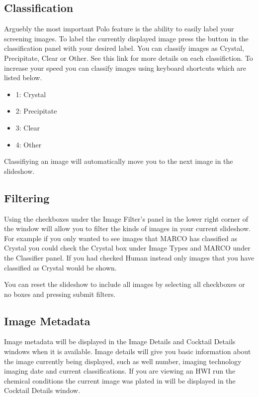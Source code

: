 \documentclass[letterpaper,10pt,english]{sphinxmanual}
\begin{document}
\subsection{Classification}
\label{\detokenize{user_guide:classification}}
Arguebly the most important Polo feature is the ability to easily
label your screening images. To label the currently displayed image
press the button in the classification panel with your desired label.
You can classify images as Crystal, Precipitate, Clear or Other.
See this link for more details on each classifiction. To increase
your speed you can classify images using keyboard shortcuts which are
listed below.
\begin{itemize}
\item {} 
1: Crystal

\item {} 
2: Precipitate

\item {} 
3: Clear

\item {} 
4: Other

\end{itemize}

Classifiying an image will automatically move you to the next image in
the slideshow.


\subsection{Filtering}
\label{\detokenize{user_guide:filtering}}
Using the checkboxes under the Image Filter’s panel in the lower
right corner of the window will allow you to filter the kinds of
images in your current slideshow. For example if you only wanted to
see images that MARCO has classified as Crystal you could check the Crystal box
under Image Types and MARCO under the Classifier panel. If you had checked Human
instead only images that you have classified as Crystal would be shown.

You can reset the slideshow to include all images by selecting all checkboxes
or no boxes and pressing submit filters.


\subsection{Image Metadata}
\label{\detokenize{user_guide:image-metadata}}
Image metadata will be displayed in the Image Details and Cocktail Details
windows when it is available. Image details will give you basic information about
the image currently being displayed, such as well number, imaging technology
imaging date and current classifications. If you are viewing an HWI run
the chemical conditions the current image was plated in will be displayed in the
Cocktail Details window.
\end{document}
